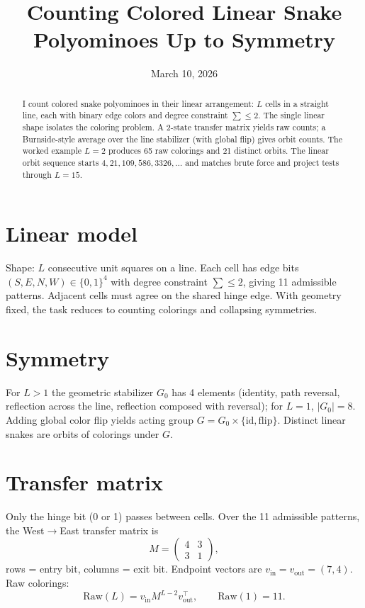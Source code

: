 \documentclass[12pt]{article}
\title{Counting Colored Linear Snake Polyominoes Up to Symmetry}
\author{}
\date{March 10, 2026}
\theoremstyle{definition}
\begin{document}
\maketitle

\begin{abstract}
I count colored snake polyominoes in their linear arrangement: \(L\) cells in a straight line, each with binary edge colors and degree constraint \(\sum\le2\). The single linear shape isolates the coloring problem. A 2-state transfer matrix yields raw counts; a Burnside-style average over the line stabilizer (with global flip) gives orbit counts. The worked example \(L=2\) produces 65 raw colorings and 21 distinct orbits. The linear orbit sequence starts \(4,21,109,586,3326,\dots\) and matches brute force and project tests through \(L=15\).
\end{abstract}

\section{Linear model}
Shape: \(L\) consecutive unit squares on a line. Each cell has edge bits \((S,E,N,W)\in\{0,1\}^4\) with degree constraint \(\sum\le2\), giving 11 admissible patterns. Adjacent cells must agree on the shared hinge edge. With geometry fixed, the task reduces to counting colorings and collapsing symmetries.

\section{Symmetry}
For \(L>1\) the geometric stabilizer \(G_0\) has 4 elements (identity, path reversal, reflection across the line, reflection composed with reversal); for \(L=1\), \(|G_0|=8\). Adding global color flip yields acting group \(G=G_0\times\{\text{id},\text{flip}\}\). Distinct linear snakes are orbits of colorings under \(G\).

\section{Transfer matrix}
Only the hinge bit (0 or 1) passes between cells. Over the 11 admissible patterns, the West\(\to\)East transfer matrix is
\[
M=\begin{pmatrix}4&3\\3&1\end{pmatrix},
\]
rows = entry bit, columns = exit bit. Endpoint vectors are \(v_{\text{in}}=v_{\text{out}}=(7,4)\). Raw colorings:
\[
\text{Raw}(L)=v_{\text{in}} M^{L-2} v_{\text{out}}^{\top},\qquad \text{Raw}(1)=11.
\]
\end{document}
